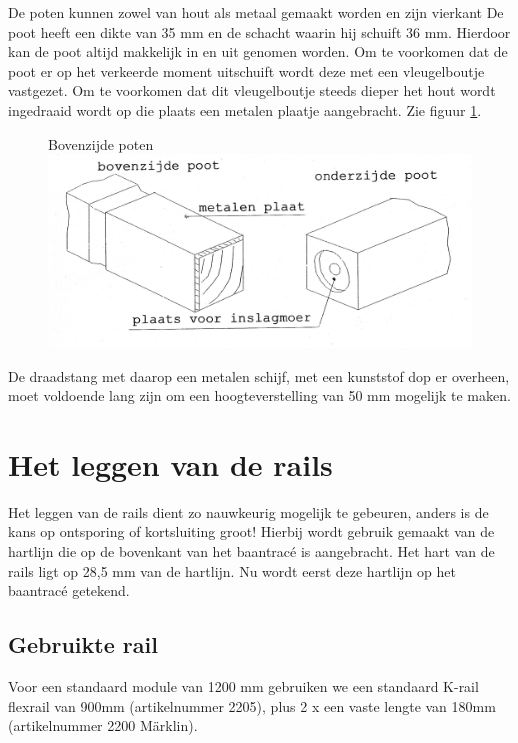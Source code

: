 \documentclass[12pt,a4paper]{report}
\newcommand*{\marklin}{M\"{a}rklin}
\newcommand*{\trace}{trac\'{e} }
\begin{document}
De poten kunnen zowel van hout als metaal gemaakt worden en zijn vierkant De poot heeft een dikte van 35 mm en de schacht waarin hij schuift 36 mm. Hierdoor kan de poot altijd makkelijk in en uit genomen worden. Om te voorkomen dat de poot er op het verkeerde moment uitschuift wordt deze met een vleugelboutje vastgezet. Om te voorkomen dat dit vleugelboutje steeds dieper het hout wordt ingedraaid wordt op die plaats een metalen plaatje aangebracht. Zie figuur \ref{figuur3}.

\begin{figure}[!ht]
  \captionbox
  {Bovenzijde poten\label{figuur3}}
  {\includegraphics[scale=0.2]{images/rcu_figuur3}}
\end{figure}

De draadstang met daarop een metalen schijf,  met een kunststof dop er overheen, moet voldoende lang zijn om een hoogteverstelling van 50 mm mogelijk te maken.

\chapter{Het leggen van de rails}
\label{ch:rails}

Het leggen van de rails dient zo nauwkeurig mogelijk te gebeuren, anders is de kans op ontsporing of kortsluiting groot! Hierbij wordt gebruik gemaakt van de hartlijn die op de bovenkant van het baan\trace is aangebracht.
Het hart van de rails ligt op 28,5 mm van de hartlijn. Nu wordt eerst deze hartlijn op het baan\trace getekend.

\section{Gebruikte rail}
Voor een standaard module van 1200 mm gebruiken we een standaard K-rail flexrail van 900mm (artikelnummer 2205), plus 2 x een vaste lengte van 180mm (artikelnummer 2200 \marklin ).
\end{document}
